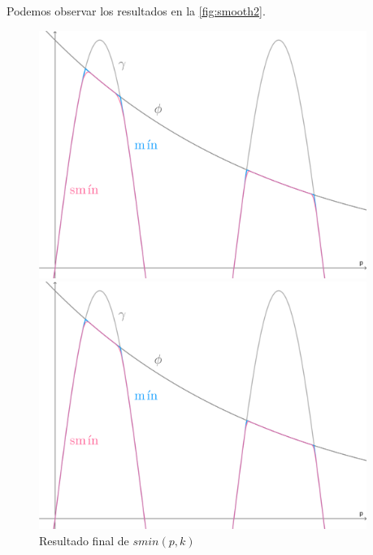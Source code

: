 Podemos observar los resultados en la \autoref{fig:smooth2}.
\begin{figure}[!h]
     \begin{minipage}[c]{0.49\linewidth}
        \centering
        \includegraphics[width=0.95\textwidth]{Plantilla-TFG-master/img/smin_3.png}
        \caption{$k=0.1,\ n=2$}
     \end{minipage}
     \begin{minipage}[c]{0.49\linewidth}
        \centering
        \includegraphics[width=0.95\textwidth]{Plantilla-TFG-master/img/smin_4.png}
        \caption{$k=0.1,\ n=3$}
     \end{minipage}
     \caption{Resultado final de $smin(p,k)$ }
     \label{fig:smooth2}
\end{figure}

